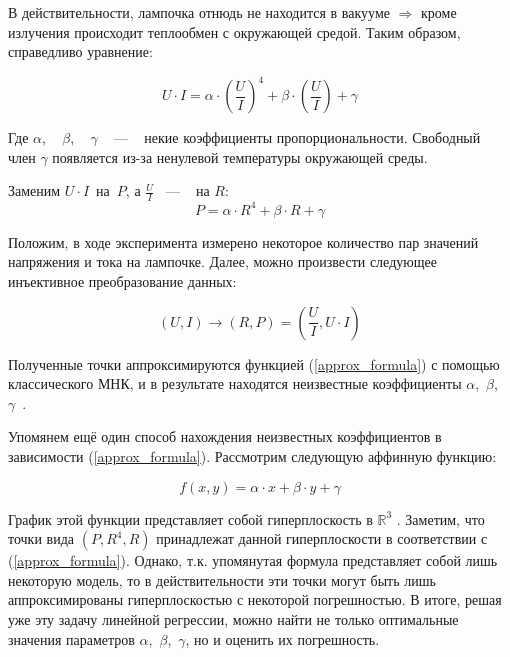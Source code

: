 \documentclass[12pt]{article}
\begin{document}
    В действительности, лампочка отнюдь не находится в вакууме $\Rightarrow$ кроме излучения происходит теплообмен с окружающей средой.
    Таким образом, справедливо уравнение:

    \begin{equation}
        U \cdot I = \alpha \cdot \left( \frac{U}{I} \right) ^ 4 + \beta \cdot \left( \frac{U}{I} \right) + \gamma
    \end{equation}

    Где $\alpha$, ~ $\beta$, ~ $\gamma$ ~ — ~ некие коэффициенты пропорциональности. Свободный член $\gamma$ появляется из-за ненулевой температуры окружающей среды.

    Заменим $U \cdot I$~на~$P$, а $\frac{U}{I}$~ — ~ на $R$:
    \begin{equation}
        \label{approx_formula}
        P = \alpha \cdot R ^ 4 + \beta \cdot R + \gamma
    \end{equation}


    Положим, в ходе эксперимента измерено некоторое количество пар значений напряжения и тока на лампочке.
    Далее, можно произвести следующее инъективное преобразование данных:

    \begin{equation*}
        \label{injection}
        (U, I) \longrightarrow (R, P) = \left( \frac{U}{I}, U \cdot I \right)
    \end{equation*}

    Полученные точки аппроксимируются функцией (\ref{approx_formula}) с помощью классического МНК, и в результате находятся неизвестные коэффициенты $\alpha$,~$\beta$,~$\gamma$~.

    Упомянем ещё один способ нахождения неизвестных коэффициентов в зависимости (\ref{approx_formula}). Рассмотрим следующую аффинную функцию:

    \begin{equation}
        f \left( x, y\right) = \alpha \cdot x + \beta \cdot y + \gamma
    \end{equation}

    График этой функции представляет собой гиперплоскость в $\mathbb{R} ^ 3$ . Заметим, что точки вида
    $ (P, R^4, R) $ принадлежат данной гиперплоскости в соответствии с (\ref{approx_formula}). Однако, т.к. упомянутая формула представляет собой лишь некоторую модель, то в действительности эти точки могут быть лишь аппроксимированы гиперплоскостью с некоторой погрешностью. В итоге, решая уже эту задачу линейной регрессии, можно найти не только оптимальные значения параметров $\alpha$,~$\beta$,~$\gamma$, но и оценить их погрешность.
\end{document}
